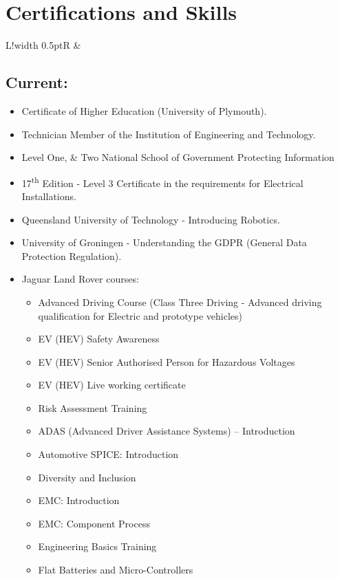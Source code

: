 \documentclass[a4paper]{article}
\newcommand\VRule{\color{lightgray}\vrule width 0.5pt}
\begin{document}
\section{Certifications and Skills}
\begin{tabularx}{\textwidth}{L!{\VRule}R}
    & \subsection{Current:}
    \begin{itemize}
        \item Certificate of Higher Education (University of Plymouth).
        \item Technician Member of the Institution of Engineering and Technology.
        \item Level One, \& Two National School of Government Protecting Information
        \item 17\textsuperscript{th} Edition - Level 3 Certificate in the requirements for Electrical Installations.
        \item Queensland University of Technology - Introducing Robotics.
        \item University of Groningen - Understanding the GDPR (General Data Protection Regulation).
        \item Jaguar Land Rover courses:
        \begin{itemize}
        \item Advanced Driving Course (Class Three Driving - Advanced driving qualification for Electric and prototype vehicles)
        \item EV (HEV) Safety Awareness
        \item EV (HEV) Senior Authorised Person for Hazardous Voltages
        \item EV (HEV) Live working certificate
        \item Risk Assessment Training %
        \item ADAS (Advanced Driver Assistance Systems) – Introduction
        \item Automotive SPICE: Introduction
        \item Diversity and Inclusion
        \item EMC: Introduction
        \item EMC: Component Process
        \item Engineering Basics Training
        \item Flat Batteries and Micro-Controllers

\end{itemize}
\end{itemize}
\end{tabularx}
\end{document}
